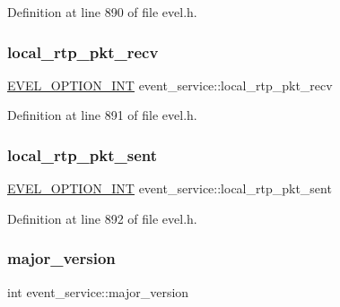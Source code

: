 Definition at line 890 of file evel.\+h.

\hypertarget{structevent__service_a1ed43f9bcff2e79d4921dd3d332f0a9f}{}\label{structevent__service_a1ed43f9bcff2e79d4921dd3d332f0a9f} 
\subsubsection{\texorpdfstring{local\+\_\+rtp\+\_\+pkt\+\_\+recv}{local\_rtp\_pkt\_recv}}
{\footnotesize\ttfamily \hyperlink{evel_8h_a452d825778d1c2368a54b8f689a25ba7}{E\+V\+E\+L\+\_\+\+O\+P\+T\+I\+O\+N\+\_\+\+I\+NT} event\+\_\+service\+::local\+\_\+rtp\+\_\+pkt\+\_\+recv}



Definition at line 891 of file evel.\+h.

\hypertarget{structevent__service_abe8309829a9899418fc437bbf7a7fa64}{}\label{structevent__service_abe8309829a9899418fc437bbf7a7fa64} 
\subsubsection{\texorpdfstring{local\+\_\+rtp\+\_\+pkt\+\_\+sent}{local\_rtp\_pkt\_sent}}
{\footnotesize\ttfamily \hyperlink{evel_8h_a452d825778d1c2368a54b8f689a25ba7}{E\+V\+E\+L\+\_\+\+O\+P\+T\+I\+O\+N\+\_\+\+I\+NT} event\+\_\+service\+::local\+\_\+rtp\+\_\+pkt\+\_\+sent}



Definition at line 892 of file evel.\+h.

\hypertarget{structevent__service_a015b00917f55574c6783389139806629}{}\label{structevent__service_a015b00917f55574c6783389139806629} 
\subsubsection{\texorpdfstring{major\+\_\+version}{major\_version}}
{\footnotesize\ttfamily int event\+\_\+service\+::major\+\_\+version}



